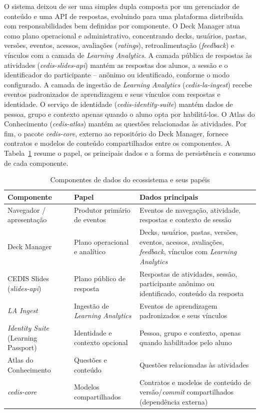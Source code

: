 O sistema deixou de ser uma simples dupla composta por um gerenciador de
conteúdo e uma API de respostas, evoluindo para uma plataforma distribuída
com responsabilidades bem definidas por componente. O Deck Manager atua
como plano operacional e administrativo, concentrando decks, usuários,
pastas, versões, eventos, acessos, avaliações (\textit{ratings}),
retroalimentação (\textit{feedback}) e vínculos com a camada de
\textit{Learning Analytics}. A camada pública de respostas às atividades
(\textit{cedis-slides-api}) mantém as respostas dos alunos, a sessão e o
identificador do participante -- anônimo ou identificado, conforme o modo
configurado. A camada de ingestão de \textit{Learning Analytics}
(\textit{cedis-la-ingest}) recebe eventos padronizados de aprendizagem e
seus vínculos com respostas e identidade. O serviço de identidade
(\textit{cedis-identity-suite}) mantém dados de pessoa, grupo e contexto
apenas quando o aluno opta por habilitá-los. O Atlas do Conhecimento
(\textit{cedis-atlas}) mantém as questões relacionadas às atividades. Por
fim, o pacote \textit{cedis-core}, externo ao repositório do Deck Manager,
fornece contratos e modelos de conteúdo compartilhados entre os
componentes. A Tabela~\ref{tab:componentes-cedis} resume o papel, os
principais dados e a forma de persistência e consumo de cada componente.

\begin{table}[htb]
\caption{Componentes de dados do ecossistema e seus papéis}
\label{tab:componentes-cedis}
\centering
\begin{tabularx}{\textwidth}{l>{\raggedright\arraybackslash}X>{\raggedright\arraybackslash}X}
\hline
\textbf{Componente} & \textbf{Papel} & \textbf{Dados principais} \\
\hline
Navegador / apresentação & Produtor primário de eventos & Eventos de navegação, atividade, respostas e contexto de sessão \\
\hline
Deck Manager & Plano operacional e analítico & Decks, usuários, pastas, versões, eventos, acessos, avaliações, \textit{feedback}, vínculos com \textit{Learning Analytics} \\
\hline
CEDIS Slides (\textit{slides-api}) & Plano público de resposta & Respostas de atividades, sessão, participante anônimo ou identificado, conteúdo da resposta \\
\hline
\textit{LA Ingest} & Ingestão de \textit{Learning Analytics} & Eventos de aprendizagem padronizados e seus vínculos \\
\hline
\textit{Identity Suite} (Learning Passport) & Identidade e contexto opcional & Pessoa, grupo e contexto, apenas quando habilitados pelo aluno \\
\hline
Atlas do Conhecimento & Questões e conteúdo & Questões relacionadas às atividades \\
\hline
\textit{cedis-core} & Modelos compartilhados & Contratos e modelos de conteúdo de versão/\textit{commit} compartilhados (dependência externa) \\
\hline
\end{tabularx}
\end{table}

